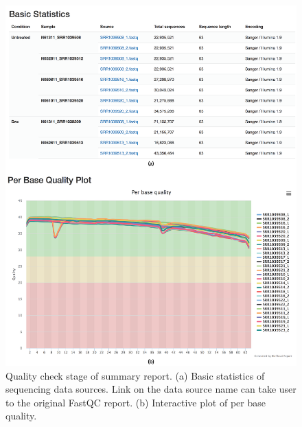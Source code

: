 \begin{figure}[!tb]
\centering
\includegraphics[width=1\textwidth]{images/report_qc}
\caption[Quality check stage of summary report]{
    Quality check stage of summary report.
    (a) Basic statistics of sequencing data sources. Link on the data source
    name can take user to the original FastQC report.
    (b) Interactive plot of per base quality.
}
\label{fig:report-qc}
\end{figure}
